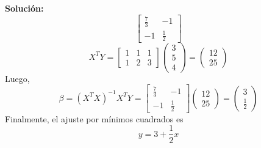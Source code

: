 \documentclass[12pt]{article}
\newenvironment{solucion}
{\begin{mdframed}[backgroundcolor=black!10]
		{\bf Solución:}\\
	}
	{
	\end{mdframed}
}
\newenvironment{preguntas}
{\begin{enumerate}\itemsep12pt
	}
	{
	\end{enumerate}
}
\begin{document}
\begin{preguntas}
\begin{solucion}
$$\begin{bmatrix}
		 \frac{7}{3} & -1 \\
		 -1 & \frac{1}{2}
		 \end{bmatrix}$$
		 $$ X^TY = \begin{bmatrix}
		 1 & 1 & 1\\
		 1 & 2 & 3
		 \end{bmatrix} \begin{pmatrix}
		 3 \\ 5 \\ 4
		 \end{pmatrix} = 
		 \begin{pmatrix}
		 12 \\ 25
		 \end{pmatrix}$$
		 Luego,
		 $$\beta = (X^TX)^{-1}X^TY
		 = \begin{bmatrix}
		 \frac{7}{3} & -1 \\
		 -1 & \frac{1}{2}
		 \end{bmatrix}\begin{pmatrix}
		 12 \\ 25
		 \end{pmatrix}
		 = \begin{pmatrix}
		 3 \\ \frac{1}{2}
		 \end{pmatrix}
		 $$
		 Finalmente, el ajuste por mínimos cuadrados es
		 $$y = 3 + \dfrac{1}{2}x$$
\end{solucion}
\end{preguntas}
\end{document}
